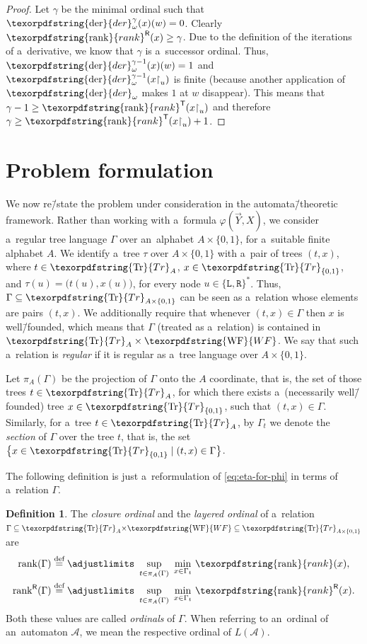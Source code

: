 \documentclass[11pt,a4paper]{amsart}
\theoremstyle{plain}
\theoremstyle{definition}
\newtheorem{defi}[thm]{Definition}
\theoremstyle{defC}
\theoremstyle{thmC}
\theoremstyle{plain}
\numberwithin{equation}{section}
\numberwithin{equation}{section}
\numberwithin{figure}{section}
\newcommand{\ident}[1]{\ensuremath{\texorpdfstring{\mathrm{\mathnm{#1}}}{#1}}\xspace}
\newcommand{\eqdef}{\stackrel{\text{def}}=}
\newcommand{\mathcalsym}[1]{\ensuremath{\mathcal{#1}}\xspace}
\newcommand{\CA}{\mathcalsym{A}}
\newcommand{\dL}{\mathtt{{\scriptstyle L}}}
\newcommand{\dR}{\mathtt{{\scriptstyle R}}}
\newcommand{\mathnm}[1]{#1}
\newcommand{\restr}{{\upharpoonright}}
\newcommand{\trees}{\ident{Tr}}
\newcommand{\WF}{\ident{WF}}
\newcommand{\der}{\ident{der}}
\newcommand{\sT}{\mathsf{T}}
\newcommand{\sR}{\mathsf{R}}
\newcommand{\rank}{\ident{rank}}
\newcommand{\rankR}{\ident{rank}^\sR}
\newcommand{\rankT}{\ident{rank}^\sT}
\renewcommand\phi\varphi
\newcommand{\derF}{\der_\omega}
\newcommand{\limitR}{\mathrm{rank}}
\newcommand{\limitF}{\mathrm{rank}^{\sR}}
\begin{document}
\begin{proof}
	Let $\gamma$ be the minimal ordinal such that $\derF^\gamma(x)(w)=0$.
	Clearly $\rankR(x)\geq\gamma$.
	Due to the definition of the iterations of a~derivative, we know that $\gamma$ is a~successor ordinal.
	Thus, $\derF^{\gamma-1}(x)(w)=1$ and $\derF^{\gamma-1}(x\restr_u)$ is finite (because another application of $\derF$ makes $1$ at $w$ disappear).
	This means that $\gamma-1\geq \rankT(x\restr_u)$ and therefore $\gamma\geq\rankT(x\restr_u)+1$.
\end{proof}



\section{Problem formulation}
\label{sec:problem}

We now re\=/state the problem under consideration in the automata\=/theoretic framework.
Rather than working with a~formula $\phi(\vec{Y},X)$, we consider a~regular tree language $\Gamma$ over an~alphabet $A\times\{0,1\}$, for a~suitable finite alphabet $A$.
We identify a~tree $\tau$ over $A\times\{0,1\}$ with a~pair of trees $(t,x)$, where $t\in\trees_A$, $x\in\trees_{\{0,1\}}$, and $\tau(u)=\big(t(u),x(u)\big)$, for every node $u\in\{\dL,\dR\}^\ast$.
Thus, $\Gamma\subseteq\trees_{A\times\{0,1\}}$ can be seen as a~relation whose elements are pairs $(t,x)$.
We additionally require that whenever $(t,x)\in\Gamma$ then $x$ is well\=/founded, which means that $\Gamma$ (treated as a~relation) is contained in $\trees_A\times \WF$.
We say that such a~relation is \emph{regular} if it is regular as a~tree language over $A\times\{0,1\}$.

Let $\pi_A(\Gamma)$ be the projection of $\Gamma$ onto the $A$ coordinate, that is,
the set of those trees $t\in\trees_A$, for which there exists a~(necessarily well\=/founded) tree $x\in\trees_{\{0,1\}}$, such that $(t,x)\in \Gamma$.
Similarly, for a~tree $t\in\trees_A$, by $\Gamma_t$ we denote the \emph{section} of $\Gamma$ over the tree $t$, that is, the set $\big\{x\in\trees_{\{0,1\}}\mid (t,x)\in\Gamma\big\}$.

The following definition is just a~reformulation of \cref{eq:eta-for-phi} in terms of a~relation $\Gamma$.

\begin{defi}
	The \emph{closure ordinal} and the \emph{layered ordinal} of a~relation $\Gamma\subseteq \trees_A{\times} \WF\subseteq \trees_{A\times\{0,1\}}$ are
	\begin{align*}
	\limitR(\Gamma) &\eqdef\adjustlimits\sup_{\ t\in\pi_A(\Gamma)\ }\min_{x\in\Gamma_t}\, \rank(x),\\
	\limitF(\Gamma) &\eqdef\adjustlimits\sup_{\ t\in\pi_A(\Gamma)\ }\min_{x\in\Gamma_t}\, \rankR(x).\\
	\end{align*}
	Both these values are called \emph{ordinals} of $\Gamma$.
	When referring to an~ordinal of an~automaton $\CA$, we mean the respective ordinal of $L({\CA})$.
\end{defi}
\end{document}
